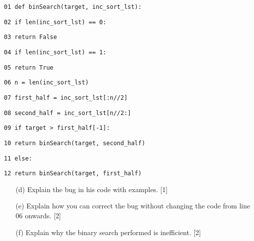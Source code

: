 \noindent %
\noindent\begin{minipage}[t]{1\columnwidth}%
\texttt{01 def binSearch(target, inc\_sort\_lst):}

\texttt{02 if len(inc\_sort\_lst) == 0: }

\texttt{03 \qquad{}return False}

\texttt{04 if len(inc\_sort\_lst) == 1: }

\texttt{05 \qquad{}return True }

\texttt{06 n = len(inc\_sort\_lst)}

\texttt{07 first\_half = inc\_sort\_lst{[}:n//2{]} }

\texttt{08 second\_half = inc\_sort\_lst{[}n//2:{]} }

\texttt{09 if target > first\_half{[}-1{]}: }

\texttt{10 \qquad{}return binSearch(target, second\_half) }

\texttt{11 else: }

\texttt{12 \qquad{}return binSearch(target, first\_half)}%
\end{minipage}
\begin{enumerate}
\item[(d)]  Explain the bug in his code with examples. \hfill{}{[}1{]}
\item[(e)]  Explain how you can correct the bug without changing the code from
line 06 onwards.\hfill{} {[}2{]}
\item[(f)]  Explain why the binary search performed is inefficient.\hfill{}
{[}2{]}
\end{enumerate}